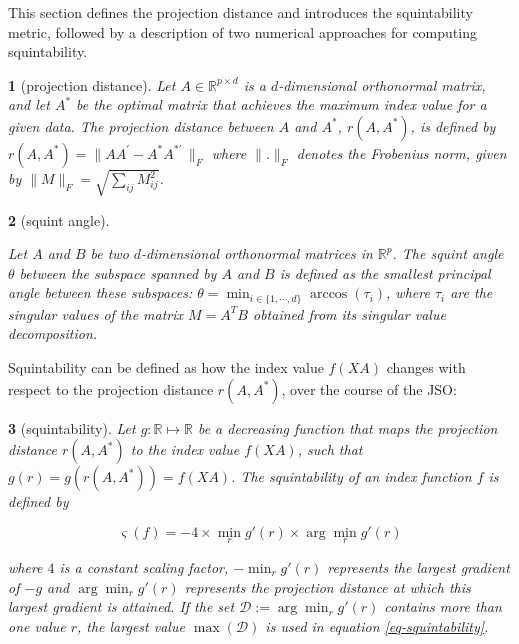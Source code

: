 \documentclass[
  12pt,
]{interact}
\theoremstyle{plain}
\newtheorem{defn}{\protect\definitionname}
\providecommand{\definitionname}{Definition}
\begin{document}
This section defines the projection distance and introduces the
squintability metric, followed by a description of two numerical
approaches for computing squintability.

\begin{defn}[projection distance]\label{def:proj-dist}
Let $A \in \mathbb{R}^{p \times d}$ is a $d$-dimensional orthonormal matrix, and let $A^*$ be the optimal matrix that achieves the maximum index value for a given data. The projection distance between $A$ 
and $A^*$, $r(A, A^*)$, is defined by
$r(A, A^*) = \lVert AA^\prime - A^*A^{*\prime}\,\rVert _F$
where $\lVert . \rVert _F$ denotes the Frobenius norm, given by
$\lVert M \rVert _F = \sqrt{\sum_{ij} M_{ij}^2}$. 
\end{defn}
\begin{defn}[squint angle]\label{def:squint-angle}
 
Let $A$ and $B$ be two $d$-dimensional orthonormal matrices in $\mathbb{R}^p$. The squint angle $\theta$ between the subspace spanned by $A$ and $B$ is defined as the smallest principal angle between these subspaces: $\theta = \min_{i \in \{1, \cdots, d\}} \arccos(\tau_i)$, where $\tau_i$ are the singular values of the matrix $M = A^T B$ obtained from its singular value decomposition.
\end{defn}

Squintability can be defined as how the index value \(f(XA)\) changes
with respect to the projection distance \(r(A, A^*)\), over the course
of the JSO:

\begin{defn}[squintability]\label{def:squintability}
Let $g: \mathbb{R} \mapsto  \mathbb{R}$ be a decreasing function that maps the projection distance $r(A, A^*)$ to the index value $f(XA)$, such that $g(r) = g(r(A, A^*)) = f(XA)$.  The squintability of an index function $f$ is defined by 

\begin{equation}
\varsigma(f) = -4 \times \min_{r} g'(r) \times \arg \min_{r} g'(r)
\label{eq-squintability}
\end{equation}

where $4$ is a constant scaling factor, $-\min_r g'(r)$ represents the 
largest gradient of $-g$ and $\arg \min_{r} g'(r)$ represents the projection distance at which this largest gradient is attained. If the set $\mathcal{D}:=\arg \min_{r} g'(r)$ contains more than one value $r$, the largest value $\max(\mathcal{D})$ is used in equation \eqref{eq-squintability}.

\end{defn}
\end{document}
